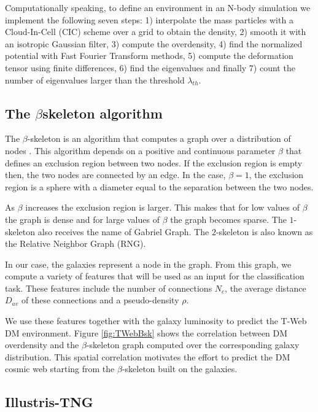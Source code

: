 \documentclass[usenatbib]{mnras}
\begin{document}
Computationally speaking, to define an environment in an N-body simulation 
we implement the following seven steps: 1) interpolate the mass particles with a Cloud-In-Cell
(CIC) scheme over a grid to obtain the density, 2) smooth it with an isotropic Gaussian filter,
3) compute the overdensity, 4) find the normalized potential with Fast Fourier Transform
methods, 5) compute the deformation tensor using finite differences, 6) find the eigenvalues and
finally 7) count the number of eigenvalues larger than the threshold $\lambda_{th}$.

\subsection{The \texorpdfstring{$\beta$}-skeleton algorithm}
The $\beta$-skeleton is an algorithm that computes a graph over a distribution of nodes
\citep{Kirkpatrick1985, Fang2019}. 
This algorithm depends on a positive and continuous parameter $\beta$ that defines an exclusion
region between two nodes.
If the exclusion region is empty then, the two nodes are connected by an edge. 
In the case, $\beta=1$, the exclusion region is a sphere with a diameter equal to the separation
between the two nodes. 

As $\beta$ increases the exclusion region is larger.
This makes that for low values of $\beta$ the graph is dense and for large values of $\beta$
the graph becomes sparse.
The $1$-skeleton also receives the name of Gabriel Graph. 
The $2$-skeleton is also known as the Relative Neighbor Graph (RNG).

In our case, the galaxies represent a node in the graph.
From this graph, we compute a variety of features that will be used as an input
for the classification task.
These features include the number of connections $N_{c}$, the average distance $D_{av}$ of these connections and a pseudo-density $\rho$.

We use these features together with the galaxy luminosity to predict the T-Web DM environment.
Figure \ref{fig:TWebBsk} shows the correlation between DM overdensity and the $\beta$-skeleton 
graph computed over the corresponding galaxy distribution.
This spatial correlation motivates the effort to predict the DM cosmic web starting from
the $\beta$-skeleton built on the galaxies.

\subsection{Illustris-TNG}
\end{document}
